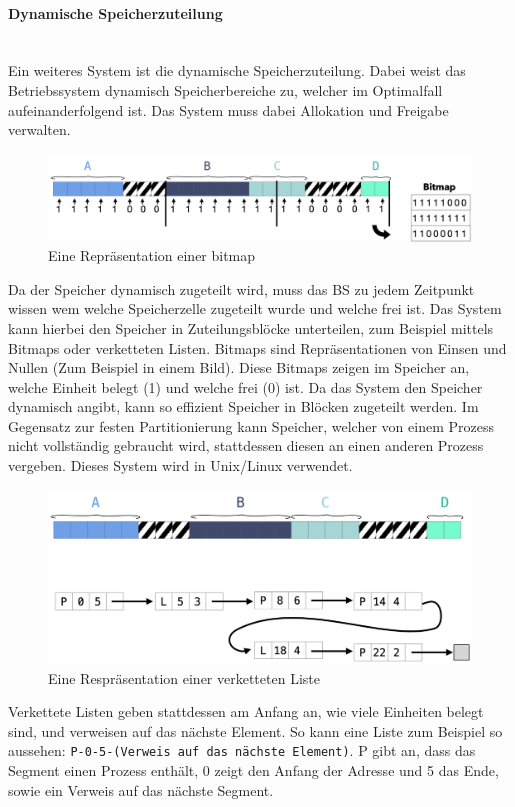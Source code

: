 \documentclass{article}
\newcommand{\paragraphlb}[1]{\paragraph{#1}\mbox{}\\}
\begin{document}
	\paragraphlb{Dynamische Speicherzuteilung}
	Ein weiteres System ist die dynamische Speicherzuteilung. Dabei weist das Betriebssystem dynamisch Speicherbereiche zu, welcher im Optimalfall aufeinanderfolgend ist. Das System muss dabei Allokation und Freigabe verwalten. \\
	\begin{figure}[H]
	\centering
	\includegraphics[scale=0.38]{Bilder/bitmap.png}
	\caption{Eine Repräsentation einer bitmap}
	\end{figure}
	Da der Speicher dynamisch zugeteilt wird, muss das BS zu jedem Zeitpunkt wissen wem welche Speicherzelle zugeteilt wurde und welche frei ist. Das System kann hierbei den Speicher in Zuteilungsblöcke unterteilen, zum Beispiel mittels Bitmaps oder verketteten Listen. Bitmaps sind Repräsentationen von Einsen und Nullen (Zum Beispiel in einem Bild). Diese Bitmaps zeigen im Speicher an, welche Einheit belegt (1) und welche frei (0) ist. Da das System den Speicher dynamisch angibt, kann so effizient Speicher in Blöcken zugeteilt werden. Im Gegensatz zur festen Partitionierung kann Speicher, welcher von einem Prozess nicht vollständig gebraucht wird, stattdessen diesen an einen anderen Prozess vergeben. Dieses System wird in Unix/Linux verwendet.
	\begin{figure}[H]
	\centering
	\includegraphics[scale=0.4]{Bilder/linkedlist.png}
	\caption{Eine Respräsentation einer verketteten Liste}
	\end{figure}
	Verkettete Listen geben stattdessen am Anfang an, wie viele Einheiten belegt sind, und verweisen auf das nächste Element. So kann eine Liste zum Beispiel so aussehen: \verb|P-0-5-(Verweis auf das nächste Element)|. P gibt an, dass das Segment einen Prozess enthält, 0 zeigt den Anfang der Adresse und 5 das Ende, sowie ein Verweis auf das nächste Segment. \\
\end{document}
